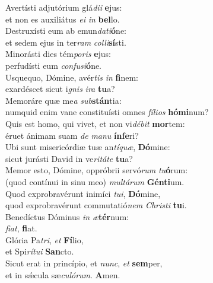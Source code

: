 \evenverse Avertísti adjutórium glá\textit{di}\textit{i} \textbf{e}jus:~\*\\
\evenverse et non es auxiliátus \textit{e}\textit{i} \textit{in} \textbf{bel}lo.\\
\oddverse Destruxísti eum ab emun\textit{da}\textit{ti}\textbf{ó}ne:~\*\\
\oddverse et sedem ejus in ter\textit{ram} \textit{col}\textit{li}\textbf{sí}sti.\\
\evenverse Minorásti dies tém\textit{po}\textit{ris} \textbf{e}jus:~\*\\
\evenverse perfudísti eum \textit{con}\textit{fu}\textit{si}\textbf{ó}ne.\\
\oddverse Usquequo, Dómine, avér\textit{tis} \textit{in} \textbf{fi}nem:~\*\\
\oddverse exardéscet sicut i\textit{gnis} \textit{i}\textit{ra} \textbf{tu}a?\\
\evenverse Memoráre quæ me\textit{a} \textit{sub}\textbf{stán}tia:~\*\\
\evenverse numquid enim vane constituísti omnes \textit{fí}\textit{li}\textit{os} \textbf{hó}\textbf{mi}num?\\
\oddverse Quis est homo, qui vivet, et non vi\textit{dé}\textit{bit} \textbf{mor}tem:~\*\\
\oddverse éruet ánimam suam \textit{de} \textit{ma}\textit{nu} \textbf{ín}\textbf{fe}ri?\\
\evenverse Ubi sunt misericórdiæ tuæ an\textit{tí}\textit{quæ}, \textbf{Dó}mine:~\*\\
\evenverse sicut jurásti David in ve\textit{ri}\textit{tá}\textit{te} \textbf{tu}a?\\
\oddverse Memor esto, Dómine, oppróbrii servó\textit{rum} \textit{tu}\textbf{ó}rum:~\*\\
\oddverse (quod contínui in sinu meo) \textit{mul}\textit{tá}\textit{rum} \textbf{Gén}\textbf{ti}um.\\
\evenverse Quod exprobravérunt inimíci \textit{tu}\textit{i}, \textbf{Dó}mine,~\*\\
\evenverse quod exprobravérunt commutatió\textit{nem} \textit{Chri}\textit{sti} \textbf{tu}i.\\
\oddverse Benedíctus Dóminus \textit{in} \textit{æ}\textbf{tér}num:~\*\\
\oddverse \textit{fi}\textit{at}, \textbf{fi}at.\\
\evenverse Glória Pa\textit{tri}, \textit{et} \textbf{Fí}lio,~\*\\
\evenverse et Spi\textit{rí}\textit{tu}\textit{i} \textbf{San}cto.\\
\oddverse Sicut erat in princípio, et \textit{nunc}, \textit{et} \textbf{sem}per,~\*\\
\oddverse et in sǽcula sæ\textit{cu}\textit{ló}\textit{rum}. \textbf{A}men.\\
